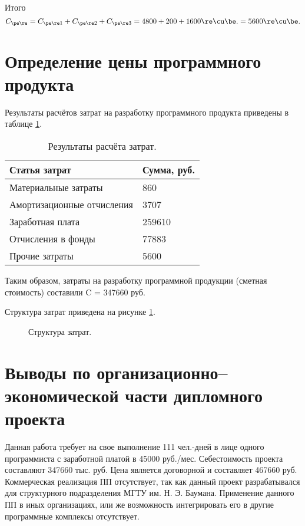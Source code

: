Итого
\begin{equation*}
    C_{\pe\re} = C_{\pe\re 1} +  C_{\pe\re 2} + C_{\pe\re 3} = 4800 + 200 + 1600 \re\cu\be. = 5600 \re\cu\be.
\end{equation*}

\section{Определение цены программного продукта}
Результаты расчётов затрат на разработку программного продукта приведены в таблице \ref{tab:cost}.

\begin{table}[H]
    \caption{\label{tab:cost}Результаты расчёта затрат.}
    \begin{tabular}[H]{|l|l|}
        \hline
        Статья затрат & Сумма, руб.\\
        \hline
        Материальные затраты & 860\\
        \hline
        Амортизационные отчисления & 3707\\
        \hline
        Заработная плата & 259610\\
        \hline
        Отчисления в фонды & 77883\\
        \hline
        Прочие затраты & 5600\\
        \hline
    \end{tabular}
\end{table}

Таким образом, затраты на разработку программной продукции (сметная стоимость) составили C = 347660 руб.

Структура затрат приведена на рисунке \ref{img:cost-structure}.
\begin{figure}[H]
    \caption{Структура затрат.}
    \label{img:cost-structure}
\end{figure}

\section{Выводы по организационно–экономической части дипломного проекта}
Данная работа требует на свое выполнение 111 чел.-дней в лице одного программиста с заработной платой в 45000 руб./мес. Себестоимость проекта составляют 347660 тыс. руб. Цена является договорной и составляет 467660 руб.
Коммерческая реализация ПП отсутствует, так как данный проект разрабатывался для структурного подразделения МГТУ им. Н. Э. Баумана. Применение данного ПП в иных организациях, или же возможность интегрировать его в другие программные комплексы отсутствует.
